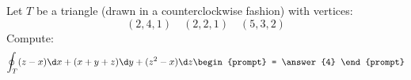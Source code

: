 \documentclass{ximera}
\author{Bart Snapp}
\begin{document}
\begin{exercise}
  Let $T$ be a triangle (drawn in a counterclockwise fashion) with
  vertices:
  \[
  (2,4,1)\quad (2,2,1) \quad (5,3,2)
  \]
  Compute:
  \[
  \oint_T (z-x) \d x + (x+y+z)\d y + (z^2-x) \d z
  \begin{prompt}
    = \answer{4}
  \end{prompt}
  \]
\end{exercise}
\end{document}
